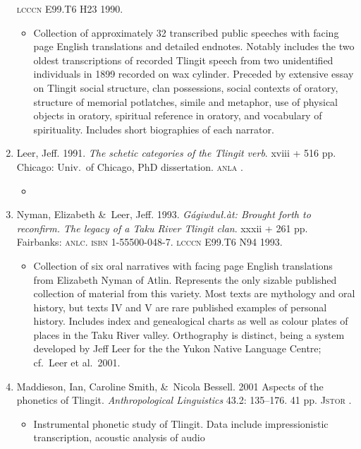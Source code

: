 \documentclass[12pt,letterpaper,oneside,article]{memoir}
\begin{document}
\begin{enumerate}
	\textsc{lcccn} E99.T6 H23 1990.
	\begin{itemize}
	\item	Collection of approximately 32 transcribed public speeches with facing page
		English translations and detailed endnotes.
		Notably includes the two oldest transcriptions of recorded Tlingit speech from
		two unidentified individuals in 1899 recorded on wax cylinder.
		Preceded by extensive essay on Tlingit social structure, clan possessions,
		social contexts of oratory, structure of memorial potlatches,
		simile and metaphor, use of physical objects in oratory, spiritual reference
		in oratory, and vocabulary of spirituality.
		Includes short biographies of each narrator.
	\end{itemize}
\item	Leer, Jeff.
	1991.
	\textit{The schetic categories of the Tlingit verb}.
	xviii + 516 pp.
	Chicago: Univ.\ of Chicago, PhD dissertation.
	\textsc{anla} .
	\begin{itemize}
	\item	{}
	\end{itemize}
\item	Nyman, Elizabeth \&\ Leer, Jeff.
	1993.
	\textit{Gágiwduł.àt: Brought forth to reconfirm. The legacy of a Taku River
		Tlingit clan}.
	xxxii + 261 pp.
	Fairbanks: \textsc{anlc}.
	\textsc{isbn} 1-55500-048-7.
	\textsc{lcccn} E99.T6 N94 1993.
	\begin{itemize}
	\item	Collection of six oral narratives with facing page English translations
		from  Elizabeth Nyman of Atlin.
		Represents the only sizable published collection of material from this variety.
		Most texts are mythology and oral history, but texts IV and V are rare
		published examples of personal history.
		Includes index and genealogical charts as well as colour plates of places
		in the Taku River valley.
		Orthography is distinct, being a system developed by Jeff Leer for the
		the Yukon Native Language Centre; cf.\ Leer et al.\ 2001.
	\end{itemize}
\item	Maddieson, Ian, Caroline Smith, \&\ Nicola Bessell.
	2001
	Aspects of the phonetics of Tlingit.
	\textit{Anthropological Linguistics} 43.2: 135–176.
	41 pp.
	\textsc{Jstor} .
	\begin{itemize}
	\item	Instrumental phonetic study of Tlingit.
		Data include impressionistic transcription, acoustic analysis of audio

\end{itemize}
\end{enumerate}
\end{document}
